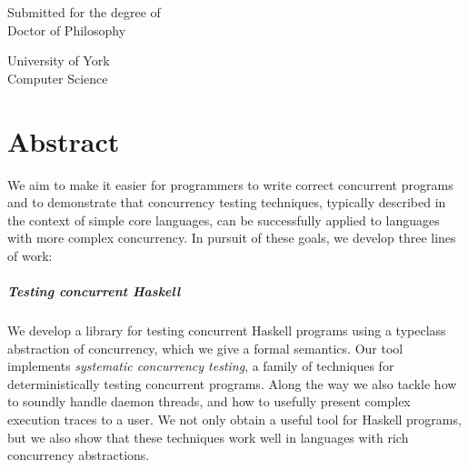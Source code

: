 \begin{titlepage}
  \begin{center}
    \makeatletter

    {\fontsize{28pt}{30pt}\selectfont \@title \par}

    \vspace{1.3cm}

    \Large

    \@author

    \vfill

    Submitted for the degree of\\
    Doctor of Philosophy

    \vspace{1cm}

    University of York\\
    Computer Science

    \vspace{1cm}

    \@date
    \makeatother
  \end{center}
\end{titlepage}

\chapter*{Abstract}

We aim to make it easier for programmers to write correct concurrent
programs and to demonstrate that concurrency testing techniques,
typically described in the context of simple core languages, can be
successfully applied to languages with more complex concurrency.  In
pursuit of these goals, we develop three lines of work:

\paragraph{Testing concurrent Haskell}
We develop a library for testing concurrent Haskell programs using a
typeclass abstraction of concurrency, which we give a formal
semantics.  Our tool implements \emph{systematic concurrency testing},
a family of techniques for deterministically testing concurrent
programs.  Along the way we also tackle how to soundly handle daemon
threads, and how to usefully present complex execution traces to a
user.  We not only obtain a useful tool for Haskell programs, but we
also show that these techniques work well in languages with rich
concurrency abstractions.

